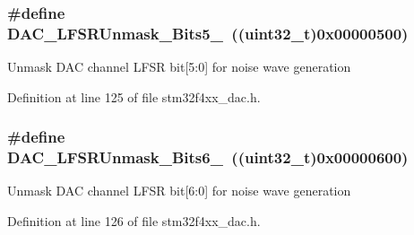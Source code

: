 \hypertarget{group___d_a_c__lfsrunmask__triangleamplitude_ga71a01660d410823bfe76a603080dc125}{
\subsubsection[{D\-A\-C\-\_\-\-L\-F\-S\-R\-Unmask\-\_\-\-Bits5\-\_\-0}]{\setlength{\rightskip}{0pt plus 5cm}\#define D\-A\-C\-\_\-\-L\-F\-S\-R\-Unmask\-\_\-\-Bits5\-\_~((uint32\-\_\-t)0x00000500)}}\label{group___d_a_c__lfsrunmask__triangleamplitude_ga71a01660d410823bfe76a603080dc125}
Unmask D\-A\-C channel L\-F\-S\-R bit\mbox{[}5\-:0\mbox{]} for noise wave generation 

Definition at line 125 of file stm32f4xx\-\_\-dac.\-h.

\hypertarget{group___d_a_c__lfsrunmask__triangleamplitude_ga48fe2d3f4274d6bf28e446ca0001ed5d}{
\subsubsection[{D\-A\-C\-\_\-\-L\-F\-S\-R\-Unmask\-\_\-\-Bits6\-\_\-0}]{\setlength{\rightskip}{0pt plus 5cm}\#define D\-A\-C\-\_\-\-L\-F\-S\-R\-Unmask\-\_\-\-Bits6\-\_~((uint32\-\_\-t)0x00000600)}}\label{group___d_a_c__lfsrunmask__triangleamplitude_ga48fe2d3f4274d6bf28e446ca0001ed5d}
Unmask D\-A\-C channel L\-F\-S\-R bit\mbox{[}6\-:0\mbox{]} for noise wave generation 

Definition at line 126 of file stm32f4xx\-\_\-dac.\-h.

